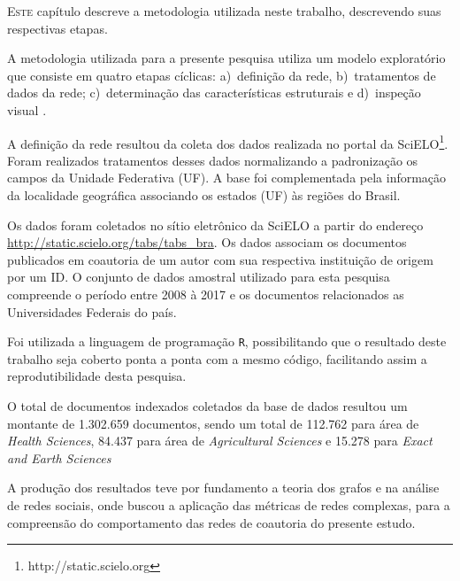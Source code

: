 
\lettrine{E}{ste} capítulo descreve a metodologia utilizada neste trabalho, descrevendo suas respectivas etapas.


A metodologia utilizada para a presente pesquisa utiliza um modelo exploratório que consiste em quatro etapas cíclicas: 
a)~definição da rede, 
b)~tratamentos de dados da rede; 
c)~determinação das características estruturais e 
d)~inspeção visual \citep{de2018exploratory}.

A definição da rede resultou da coleta dos dados realizada no portal da SciELO\footnote{http://static.scielo.org}. 
Foram  realizados tratamentos desses dados normalizando a padronização os campos da Unidade Federativa (UF). 
A base foi complementada pela informação da localidade geográfica associando os estados (UF) às regiões do Brasil. 

Os dados foram coletados no sítio eletrônico da SciELO a partir do endereço \url{http://static.scielo.org/tabs/tabs_bra}. Os dados associam os documentos publicados em coautoria de um autor com sua respectiva instituição de origem por um ID. O conjunto de dados amostral utilizado para esta pesquisa compreende o período entre 2008 à 2017 e os documentos relacionados as Universidades Federais do país.  

Foi utilizada a linguagem de programação \texttt R, possibilitando que o resultado deste trabalho seja coberto ponta a ponta com a mesmo código, facilitando assim a reprodutibilidade desta pesquisa.

O total de documentos indexados coletados da base de dados resultou um montante de 1.302.659 documentos, sendo um total de 112.762 para área de \textit{Health Sciences}, 84.437 para área de \textit{Agricultural Sciences} e 15.278 para \textit{Exact and Earth Sciences}

A produção dos resultados teve por fundamento a teoria dos grafos e na análise de redes sociais, onde buscou a aplicação das métricas de redes complexas, para a compreensão do comportamento das redes de coautoria do presente estudo.

